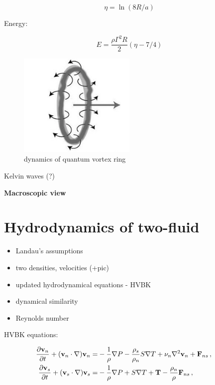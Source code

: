 \begin{equation}
\eta = \ln(8R/a)
\end{equation}

Energy:

\begin{equation}
E = \frac{\rho \Gamma^2 R}{2} (\eta - 7/4)
\end{equation}


\begin{figure}[h]
	\centering
	\includegraphics[width=0.5\textwidth]{graphics/theory/vortex-ring}
	\caption{dynamics of quantum vortex ring}
	\label{vortex-ring}
\end{figure}

Kelvin waves (?)

\newpage

{\Huge \bfseries Macroscopic view}
\vspace{0.3cm}

\section{Hydrodynamics of two-fluid}
\begin{itemize}
	\item Landau's assumptions
	\item two densities, velocities (+pic)
	\item updated hydrodynamical equations - HVBK
	\item dynamical similarity
	\item Reynolds number
\end{itemize}

HVBK equations:

\begin{align}
\frac{\partial\vec{v}_n}{\partial t} + (\vec{v}_n\cdot \nabla)\vec{v}_n =& -\frac{1}{\rho} \nabla P - \frac{\rho_s}{\rho_n} S \nabla T + \nu_n \nabla^2 \vec{v}_n + \vec{F}_{ns}\,,
\label{motion_normal}\\
\frac{\partial\vec{v}_s}{\partial t} + (\vec{v}_s\cdot \nabla)\vec{v}_s =& -\frac{1}{\rho} \nabla P + S \nabla T + \vec{T} - \frac{\rho_n}{\rho} \vec{F}_{ns}\,,
\hspace{15mm}
\label{motion_super}
\end{align}

